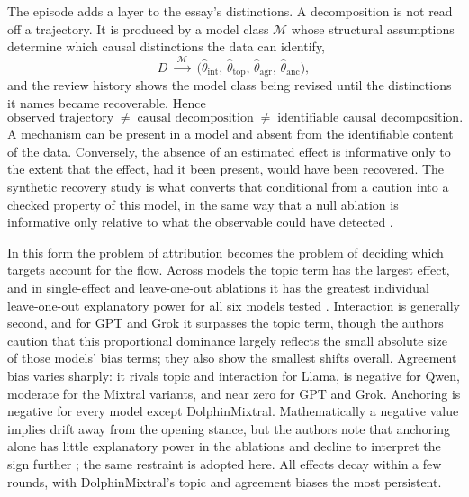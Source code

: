 \documentclass[11pt]{article}
\theoremstyle{definition}
\theoremstyle{remark}
\begin{document}
The episode adds a layer to the essay's distinctions. A decomposition is not read off a trajectory. It is produced by a model class $\mathcal{M}$ whose structural assumptions determine which causal distinctions the data can identify,
\begin{equation}
D \;\xrightarrow{\;\mathcal{M}\;}\; \big(\hat{\theta}_{\mathrm{int}},\, \hat{\theta}_{\mathrm{top}},\, \hat{\theta}_{\mathrm{agr}},\, \hat{\theta}_{\mathrm{anc}}\big),
\end{equation}
and the review history shows the model class being revised until the distinctions it names became recoverable. Hence
\begin{equation}
\text{observed trajectory} \;\neq\; \text{causal decomposition} \;\neq\; \text{identifiable causal decomposition}.
\end{equation}
A mechanism can be present in a model and absent from the identifiable content of the data. Conversely, the absence of an estimated effect is informative only to the extent that the effect, had it been present, would have been recovered. The synthetic recovery study is what converts that conditional from a caution into a checked property of this model, in the same way that a null ablation is informative only relative to what the observable could have detected \cite{flyxion-ablation}.

In this form the problem of attribution becomes the problem of deciding which targets account for the flow. Across models the topic term has the largest effect, and in single-effect and leave-one-out ablations it has the greatest individual leave-one-out explanatory power for all six models tested \cite{brockers2026}. Interaction is generally second, and for GPT and Grok it surpasses the topic term, though the authors caution that this proportional dominance largely reflects the small absolute size of those models' bias terms; they also show the smallest shifts overall. Agreement bias varies sharply: it rivals topic and interaction for Llama, is negative for Qwen, moderate for the Mixtral variants, and near zero for GPT and Grok. Anchoring is negative for every model except DolphinMixtral. Mathematically a negative value implies drift away from the opening stance, but the authors note that anchoring alone has little explanatory power in the ablations and decline to interpret the sign further \cite{brockers2026peer}; the same restraint is adopted here. All effects decay within a few rounds, with DolphinMixtral's topic and agreement biases the most persistent.
\end{document}
